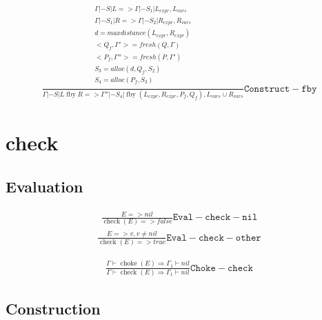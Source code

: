 \documentclass{scrartcl}
\DeclareMathOperator{\checkop}{check}
\DeclareMathOperator{\fby}{fby}
\DeclareMathOperator{\choke}{choke}
\begin{document}
    \begin{align*}
    \frac{
        \begin{matrix}
        \Gamma |- S | L => \Gamma |- S_1 | L_{expr}, L_{vars} \\
        \Gamma |- S_1 | R => \Gamma |- S_2 | R_{expr}, R_{vars} \\
        d = maxdistance(L_{expr}, R_{expr}) \\
        <Q_f, \Gamma'> = fresh(Q, \Gamma) \\
        <P_f, \Gamma''> = fresh(P, \Gamma') \\
        S_3 = alloc(d, Q_f, S_2) \\
        S_4 = alloc(P_f, S_3) \\
        \end{matrix}
    }{
        \Gamma |- S | L \fby R => \Gamma'' |- S_4 | \fby(L_{expr}, R_{expr}, P_f, Q_f), L_{vars} \cup R_{vars}
    }\mathtt{Construct-fby}
    \end{align*}
    
    \section{check}
    
    \subsection{Evaluation}
    
    \begin{align*}
        \frac{
            E => nil
        }{
            \checkop(E) => false
        }\mathtt{Eval-check-nil}
    \end{align*}
    \begin{align*}
        \frac{
            E => v, v \neq nil
        }{
            \checkop(E) => true
        }\mathtt{Eval-check-other}
    \end{align*}
    
    \begin{align*}
        \frac{
            \Gamma \vdash \choke(E) \Rightarrow \Gamma_1 \vdash nil
        }{
            \Gamma \vdash \checkop(E) \Rightarrow \Gamma_1 \vdash nil
        }\mathtt{Choke-check}
    \end{align*}
    
    \subsection{Construction}
    
\end{document}
